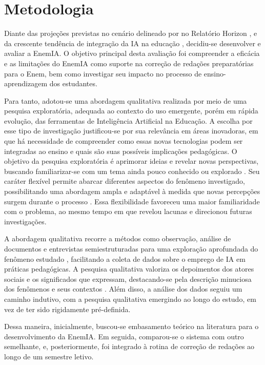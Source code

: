 \documentclass[portuguese]{textolivre}
\begin{document}
\section{Metodologia}\label{metodologia}

Diante das projeções previstas no cenário delineado por no Relatório Horizon \cite{educause2023horizon} \cite{vicari2018ia}, e da crescente tendência de integração da IA na educação \cite{loiola2024chatgpt}, decidiu-se desenvolver e avaliar a EnemIA. O objetivo principal desta avaliação foi compreender a eficácia e as limitações do EnemIA como suporte na correção de redações preparatórias para o Enem, bem como investigar seu impacto no processo de ensino-aprendizagem dos estudantes. 

Para tanto, adotou-se uma abordagem qualitativa realizada por meio de uma pesquisa exploratória, adequada ao contexto do uso emergente, porém em rápida evolução, das ferramentas de Inteligência Artificial na Educação. A escolha por esse tipo de investigação justificou-se por sua relevância em áreas inovadoras, em que há necessidade de compreender como essas novas tecnologias podem ser integradas ao ensino e quais são suas possíveis implicações pedagógicas. O objetivo da pesquisa exploratória é aprimorar ideias e revelar novas perspectivas, buscando familiarizar-se com um tema ainda pouco conhecido ou explorado \cite{gil2008projetos}. Seu caráter flexível permite abarcar diferentes aspectos do fenômeno investigado, possibilitando uma abordagem ampla e adaptável à medida que novas percepções surgem durante o processo \cite{gerhardt2009metodos}. Essa flexibilidade favoreceu uma maior familiaridade com o problema, ao mesmo tempo em que revelou lacunas e direcionou futuras investigações.

A abordagem qualitativa recorre a métodos como observação, análise de documentos e entrevistas semiestruturadas para uma exploração aprofundada do fenômeno estudado \cite{ribeiro2024entrevista}, facilitando a coleta de dados sobre o emprego de IA em práticas pedagógicas. A pesquisa qualitativa valoriza os depoimentos dos atores sociais e os significados que expressam, destacando-se pela descrição minuciosa dos fenômenos e seus contextos \cite{vieira2005pesquisa}. Além disso, a análise dos dados seguiu um caminho indutivo, com a pesquisa qualitativa emergindo ao longo do estudo, em vez de ter sido rigidamente pré-definida. 

Dessa maneira, inicialmente, buscou-se embasamento teórico na literatura para o desenvolvimento da EnemIA. Em seguida, comparou-se o sistema com outro semelhante, e, posteriormente, foi integrado à rotina de correção de redações ao longo de um semestre letivo.
\end{document}

